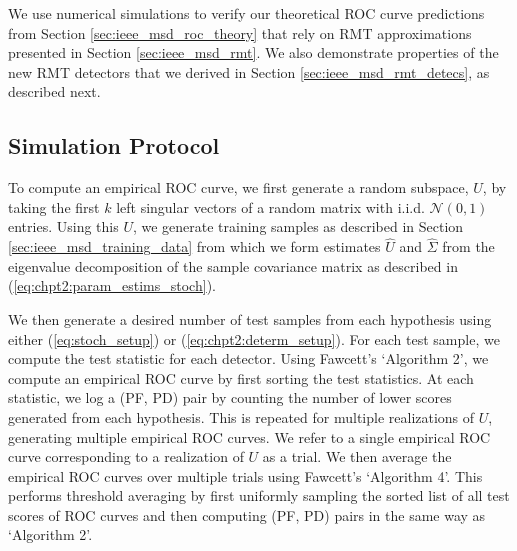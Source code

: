 We use numerical simulations to verify our theoretical ROC curve predictions from Section \ref{sec:ieee_msd_roc_theory} that rely on RMT approximations presented in Section \ref{sec:ieee_msd_rmt}. We also demonstrate properties of the new RMT detectors that we derived in Section \ref{sec:ieee_msd_rmt_detecs}, as described next.


\subsection{Simulation Protocol}\label{sec:sim_proto}

To compute an empirical ROC curve, we first generate a random subspace, $U$, by taking the first $k$ left singular vectors of a random matrix with i.i.d. $\mathcal{N}(0,1)$ entries. Using this $U$, we generate training samples as described in Section \ref{sec:ieee_msd_training_data} from which we form estimates $\widehat{U}$ and $\widehat{\Sigma}$ from the eigenvalue decomposition of the sample covariance matrix as described in (\ref{eq:chpt2:param_estims_stoch}).

We then generate a desired number of test samples from each hypothesis using either (\ref{eq:stoch_setup}) or (\ref{eq:chpt2:determ_setup}). For each test sample, we compute the test statistic for each detector. Using Fawcett's \cite{fawcett2006introduction} `Algorithm 2', we compute an empirical ROC curve by first sorting the test statistics. At each statistic, we log a (PF, PD) pair by counting the number of lower scores generated from each hypothesis. This is repeated for multiple realizations of $U$, generating multiple empirical ROC curves. We refer to a single empirical ROC curve corresponding to a realization of $U$ as a trial. We then average the empirical ROC curves over multiple trials using Fawcett's \cite{fawcett2006introduction} `Algorithm 4'. This performs threshold averaging by first uniformly sampling the sorted list of all test scores of ROC curves and then computing (PF, PD) pairs in the same way as `Algorithm 2'.


